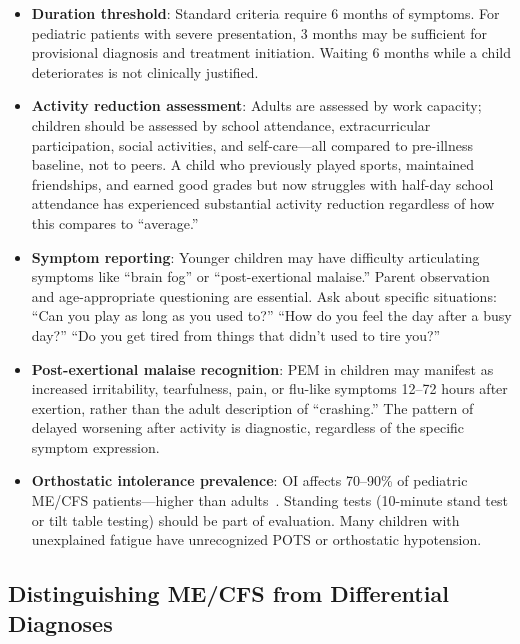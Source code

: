 \begin{itemize}
    \item \textbf{Duration threshold}: Standard criteria require 6 months of symptoms. For pediatric patients with severe presentation, 3 months may be sufficient for provisional diagnosis and treatment initiation. Waiting 6 months while a child deteriorates is not clinically justified.

    \item \textbf{Activity reduction assessment}: Adults are assessed by work capacity; children should be assessed by school attendance, extracurricular participation, social activities, and self-care---all compared to pre-illness baseline, not to peers. A child who previously played sports, maintained friendships, and earned good grades but now struggles with half-day school attendance has experienced substantial activity reduction regardless of how this compares to ``average.''

    \item \textbf{Symptom reporting}: Younger children may have difficulty articulating symptoms like ``brain fog'' or ``post-exertional malaise.'' Parent observation and age-appropriate questioning are essential. Ask about specific situations: ``Can you play as long as you used to?'' ``How do you feel the day after a busy day?'' ``Do you get tired from things that didn't used to tire you?''

    \item \textbf{Post-exertional malaise recognition}: PEM in children may manifest as increased irritability, tearfulness, pain, or flu-like symptoms 12--72 hours after exertion, rather than the adult description of ``crashing.'' The pattern of delayed worsening after activity is diagnostic, regardless of the specific symptom expression.

    \item \textbf{Orthostatic intolerance prevalence}: OI affects 70--90\% of pediatric ME/CFS patients---higher than adults~\cite{Rowe2017pediatric}. Standing tests (10-minute stand test or tilt table testing) should be part of evaluation. Many children with unexplained fatigue have unrecognized POTS or orthostatic hypotension.
\end{itemize}

\subsection{Distinguishing ME/CFS from Differential Diagnoses}
\label{subsec:ped-differentials}

